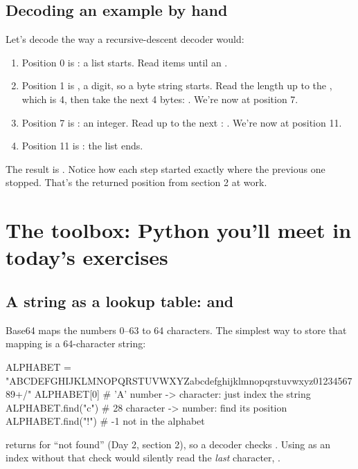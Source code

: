 \documentclass[10pt,a4paper]{article}
\begin{document}
\subsection{Decoding an example by hand}
Let’s decode  the way a recursive-descent decoder would:
\begin{enumerate}
\item Position 0 is : a list starts. Read items until an .
\item Position 1 is , a digit, so a byte string starts. Read the length up to the \code{:\allowbreak{}}, which is 4, then take the next 4 bytes: . We’re now at position 7.
\item Position 7 is : an integer. Read up to the next : . We’re now at position 11.
\item Position 11 is : the list ends.
\end{enumerate}
The result is . Notice how each step started exactly where the previous one stopped. That’s the returned position from section 2 at work.
\setcounter{section}{6}
\section{The toolbox: Python you’ll meet in today’s exercises}
\subsection{A string as a lookup table:  and }
Base64 maps the numbers 0–63 to 64 characters. The simplest way to store that mapping is a 64-character string:
\begin{pycode}
ALPHABET = "ABCDEFGHIJKLMNOPQRSTUVWXYZabcdefghijklmnopqrstuvwxyz0123456789+/"
ALPHABET[0]        # 'A'    number -> character: just index the string
ALPHABET.find("c") # 28     character -> number: find its position
ALPHABET.find("!") # -1     not in the alphabet
\end{pycode}
 returns  for “not found” (Day 2, section 2), so a decoder checks . Using  as an index without that check would silently read the \emph{last} character, \code{\textquotedbl{}/\allowbreak{}\textquotedbl{}}.
\end{document}
